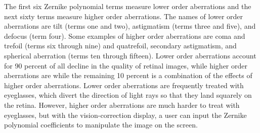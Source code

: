 The first six Zernike polynomial terms measure lower order aberrations and the next sixty terms measure higher order aberrations. The names of lower order aberrations are tilt (terms one and two), astigmatism (terms three and five), and defocus (term four). Some examples of higher order aberrations are coma and trefoil (terms six through nine) and quatrefoil, secondary astigmatism, and spherical aberration (terms ten through fifteen). Lower order aberrations account for 90 percent of all decline in the quality of retinal images, while higher order aberrations are while the remaining 10 percent is a combination of the effects of higher order aberrations. Lower order aberrations are frequently treated with eyeglasses, which divert the direction of light rays so that they land squarely on the retina. However, higher order aberrations are much harder to treat with eyeglasses, but with the vision-correction display, a user can input the Zernike polynomial coefficients to manipulate the image on the screen.






